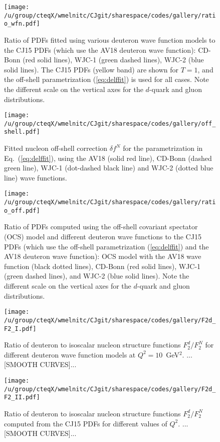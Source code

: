 \documentclass[aps,prd,amsmath,preprint]{revtex4}
\begin{document}
\begin{figure}[t]
\texttt{[image: /u/group/cteqX/wmelnitc/CJgit/sharespace/codes/gallery/ratio\_wfn.pdf]}
\caption{Ratio of PDFs fitted using various deuteron wave function models
	to the CJ15 PDFs (which use the AV18 deuteron wave function):
	CD-Bonn (red solid lines),
	WJC-1 (green dashed lines),
	WJC-2 (blue solid lines).
	The CJ15 PDFs (yellow band) are shown for $T=1$, and the
	off-shell parametrization (\ref{eq:delffit}) is used for
	all cases.  Note the different scale on the vertical axes
	for the	$d$-quark and gluon distributions.}
\label{fig:ratio_wfn}
\end{figure} 


\begin{figure}[t]
\texttt{[image: /u/group/cteqX/wmelnitc/CJgit/sharespace/codes/gallery/off\_shell.pdf]}
\caption{Fitted nucleon off-shell correction $\delta f^N$ for the
	parametrization in Eq.~(\ref{eq:delffit}), using the
	AV18 (solid red line), CD-Bonn (dashed green line),
	WJC-1 (dot-dashed black line) and WJC-2 (dotted blue line)
	wave functions.}
\label{fig:off_shell}
\end{figure} 


\begin{figure}[t]
\texttt{[image: /u/group/cteqX/wmelnitc/CJgit/sharespace/codes/gallery/ratio\_off.pdf]}
\caption{Ratio of PDFs computed using the off-shell covariant spectator
	(OCS) model and different deuteron wave functions to the CJ15
	PDFs (which use the off-shell parametrization (\ref{eq:delffit})
	and the AV18 deuteron wave function):
	OCS model with the AV18 wave function (black dotted lines),
	CD-Bonn (red solid lines),
	WJC-1 (green dashed lines), and
	WJC-2 (blue solid lines).
	Note the different scale on the vertical axes for the
	$d$-quark and gluon distributions.}
\label{fig:ratio_off}
\end{figure} 


\begin{figure}[t]
\texttt{[image: /u/group/cteqX/wmelnitc/CJgit/sharespace/codes/gallery/F2d\_F2\_I.pdf]}
\caption{Ratio of deuteron to isoscalar nucleon structure functions
	$F_2^d/F_2^N$ for different deuteron wave function models
	at $Q^2=10$~GeV$^2$.
	{\color{red} ...[SMOOTH CURVES]...}}
\label{fig:F2dN}
\end{figure}


\begin{figure}[t]
\texttt{[image: /u/group/cteqX/wmelnitc/CJgit/sharespace/codes/gallery/F2d\_F2\_II.pdf]}
\caption{Ratio of deuteron to isoscalar nucleon structure functions
	$F_2^d/F_2^N$ computed from the CJ15 PDFs for different
	values of $Q^2$.
	{\color{red} ...[SMOOTH CURVES]...}}
\label{fig:F2dN_Q2}
\end{figure}
\end{document}
